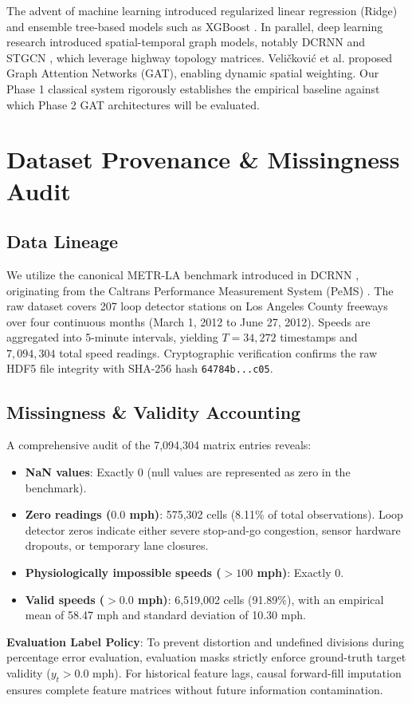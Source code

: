 \documentclass[conference]{IEEEtran}
\begin{document}
The advent of machine learning introduced regularized linear regression (Ridge) \cite{hoerl1970ridge} and ensemble tree-based models such as XGBoost \cite{chen2016xgboost}. In parallel, deep learning research introduced spatial-temporal graph models, notably DCRNN \cite{li2018diffusion} and STGCN \cite{yu2018spatio}, which leverage highway topology matrices. Veli{\v{c}}kovi{\'c} et al. \cite{velickovic2018graph} proposed Graph Attention Networks (GAT), enabling dynamic spatial weighting. Our Phase 1 classical system rigorously establishes the empirical baseline against which Phase 2 GAT architectures will be evaluated.

\section{Dataset Provenance \& Missingness Audit}
\subsection{Data Lineage}
We utilize the canonical METR-LA benchmark introduced in DCRNN \cite{li2018diffusion}, originating from the Caltrans Performance Measurement System (PeMS) \cite{caltrans2012pems}. The raw dataset covers 207 loop detector stations on Los Angeles County freeways over four continuous months (March 1, 2012 to June 27, 2012). Speeds are aggregated into 5-minute intervals, yielding $T = 34,272$ timestamps and $7,094,304$ total speed readings. Cryptographic verification confirms the raw HDF5 file integrity with SHA-256 hash \texttt{64784b...c05}.

\subsection{Missingness \& Validity Accounting}
A comprehensive audit of the 7,094,304 matrix entries reveals:
\begin{itemize}
    \item \textbf{NaN values}: Exactly 0 (null values are represented as zero in the benchmark).
    \item \textbf{Zero readings ($0.0$ mph)}: 575,302 cells (8.11\% of total observations). Loop detector zeros indicate either severe stop-and-go congestion, sensor hardware dropouts, or temporary lane closures.
    \item \textbf{Physiologically impossible speeds ($>100$ mph)}: Exactly 0.
    \item \textbf{Valid speeds ($>0.0$ mph)}: 6,519,002 cells (91.89\%), with an empirical mean of 58.47 mph and standard deviation of 10.30 mph.
\end{itemize}
\textbf{Evaluation Label Policy}: To prevent distortion and undefined divisions during percentage error evaluation, evaluation masks strictly enforce ground-truth target validity ($y_t > 0.0$ mph). For historical feature lags, causal forward-fill imputation ensures complete feature matrices without future information contamination.
\end{document}
